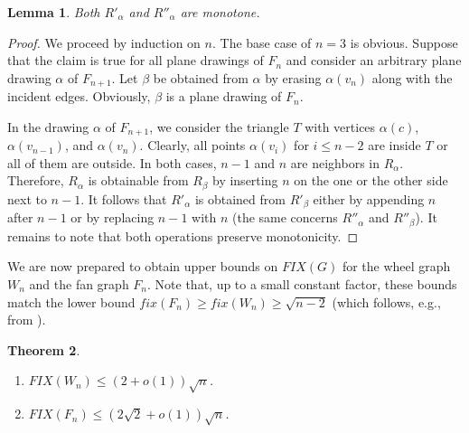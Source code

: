 \documentclass[reqno,12pt]{amsart}
\newtheorem{theorem}{Theorem}[section]
\newtheorem{lemma}[theorem]{Lemma}
\newcounter{claim}
\newenvironment{bfenumerate}{\renewcommand{\labelenumi}{{\bf\theenumi.}}\renewcommand{\labelenumii}{{\bf(\theenumii)}}\begin{enumerate}}{\end{enumerate}}
\newcommand{\fix}[1]{\mathit{fix}(#1)}
\newcommand{\FIX}[1]{\mathit{FIX}(#1)}
\begin{document}
\begin{lemma}\label{lem:fans}
Both $R'_\alpha$ and $R''_\alpha$ are monotone.
\end{lemma}

\begin{proof}
We proceed by induction on $n$. The base case of $n=3$ is obvious.
Suppose that the claim is true for all plane drawings of $F_n$
and consider an arbitrary plane drawing $\alpha$ of $F_{n+1}$.
Let $\beta$ be obtained from $\alpha$ by erasing $\alpha(v_n)$
along with the incident edges. Obviously, $\beta$ is a plane drawing of $F_{n}$.

In the drawing $\alpha$ of $F_{n+1}$, we consider the triangle
$T$ with vertices $\alpha(c)$, $\alpha(v_{n-1})$, and
$\alpha(v_n)$. Clearly, all points $\alpha(v_i)$ for $i\le n-2$ are inside $T$
or all of them are outside. In both cases, $n-1$ and $n$ are neighbors in $R_\alpha$.
Therefore, $R_\alpha$ is obtainable from $R_\beta$ by inserting $n$ on the one
or the other side next to $n-1$. It follows that $R'_\alpha$ is obtained from
$R'_\beta$ either by appending $n$ after $n-1$ or by replacing $n-1$ with $n$
(the same concerns $R''_\alpha$ and $R''_\beta$). It remains to note that
both operations preserve monotonicity.
\end{proof}

We are now prepared to obtain upper bounds on $\FIX G$ for the wheel graph $W_n$ 
and the fan graph $F_n$.
Note that, up to a small constant factor, these bounds
match the lower bound $\fix{F_n}\ge\fix{W_n}\ge\sqrt{n-2}$ (which follows, e.g., from
\cite[Theorem 4.1]{RVe}).

\begin{theorem}\label{thm:FIXWnFn}
\mbox{}

\begin{bfenumerate}
\item
$\FIX{W_n}\le(2+o(1))\sqrt n$.
\item
$\FIX{F_n}\le(2\sqrt2+o(1))\sqrt n$.
\end{bfenumerate}
\end{theorem}
 
\end{document}
